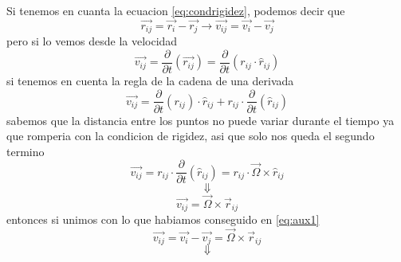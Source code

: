 \documentclass[../Main.tex]{subfiles}
\begin{document}
{    Si tenemos en cuanta la ecuacion \ref{eq:condrigidez}, podemos decir que 
    \begin{equation}
        \vec{r_{ij}} = \vec{r_i} - \vec{r_j} \rightarrow \vec{v_{ij}} = \vec{v_i} - \vec{v_j}
        \label{eq:aux1}
    \end{equation}
    pero si lo vemos desde la velocidad
    \begin{equation*}
        \vec{v_{ij}} = \frac{\partial }{\partial t} \left( \vec{r_{ij}} \right) = \frac{\partial }{\partial t} \left( r_{ij} \cdot \hat{r}_{ij} \right)
    \end{equation*}
    si tenemos en cuenta la regla de la cadena de una derivada
    \begin{equation*}
        \vec{v_{ij}} = \frac{\partial }{\partial t} \left( r_{ij} \right) \cdot \hat{r}_{ij} + r_{ij} \cdot \frac{\partial }{\partial t} \left( \hat{r}_{ij} \right)
    \end{equation*}
    sabemos que la distancia entre los puntos no puede variar durante el tiempo
    ya que romperia con la condicion de rigidez, asi que solo nos queda el segundo
    termino
    \begin{equation*}
        \vec{v_{ij}} = r_{ij} \cdot \frac{\partial }{\partial t} \left( \hat{r}_{ij} \right) = r_{ij} \cdot \vec{\Omega} \times \hat{r}_{ij}
    \end{equation*}
    \begin{equation*}
        \Downarrow
    \end{equation*}
    \begin{equation*}
        \vec{v_{ij}} = \vec{\Omega} \times \vec{r}_{ij}
    \end{equation*}
    entonces si unimos con lo que habiamos conseguido en \ref{eq:aux1}
    \begin{equation*}
        \vec{v_{ij}} = \vec{v_i} - \vec{v_j} = \vec{\Omega} \times \vec{r}_{ij}
    \end{equation*}
    \begin{equation*}
        \Downarrow
    \end{equation*}

        }
\end{document}

